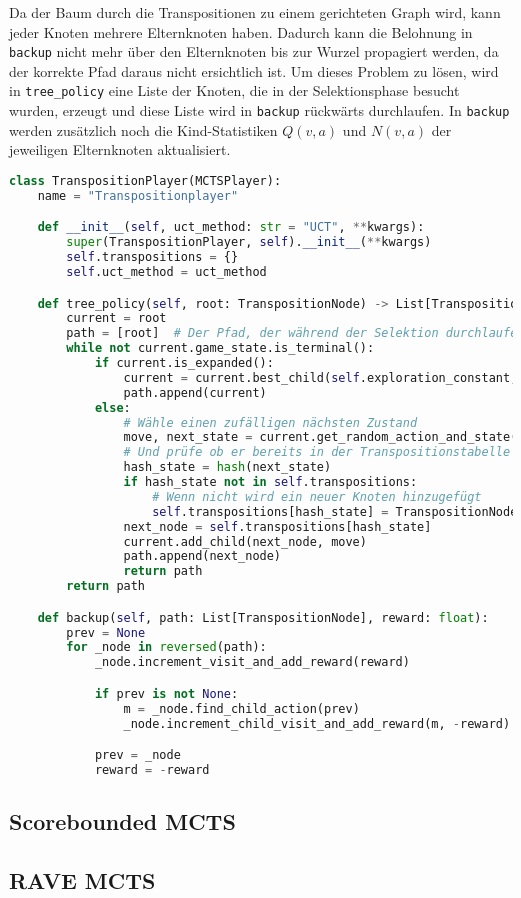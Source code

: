 Da der Baum durch die Transpositionen zu einem gerichteten Graph wird, kann jeder Knoten mehrere Elternknoten haben.
Dadurch kann die Belohnung in \verb|backup| nicht mehr über den Elternknoten bis zur Wurzel propagiert werden, da der korrekte Pfad daraus nicht ersichtlich ist.
Um dieses Problem zu lösen, wird in \verb|tree_policy| eine Liste der Knoten, die in der Selektionsphase besucht wurden, erzeugt und diese Liste wird in \verb|backup| rückwärts durchlaufen.
In \verb|backup| werden zusätzlich noch die Kind-Statistiken $Q(v,a)$ und $N(v,a)$ der jeweiligen Elternknoten aktualisiert.

\begin{lstlisting}[language=Python,label={lst:transposition-player}]
class TranspositionPlayer(MCTSPlayer):
    name = "Transpositionplayer"

    def __init__(self, uct_method: str = "UCT", **kwargs):
        super(TranspositionPlayer, self).__init__(**kwargs)
        self.transpositions = {}
        self.uct_method = uct_method

    def tree_policy(self, root: TranspositionNode) -> List[TranspositionNode]:
        current = root
        path = [root]  # Der Pfad, der während der Selektion durchlaufen wird
        while not current.game_state.is_terminal():
            if current.is_expanded():
                current = current.best_child(self.exploration_constant, uct_method=self.uct_method)
                path.append(current)
            else:
                # Wähle einen zufälligen nächsten Zustand
                move, next_state = current.get_random_action_and_state()
                # Und prüfe ob er bereits in der Transpositionstabelle enthalten ist
                hash_state = hash(next_state)
                if hash_state not in self.transpositions:
                    # Wenn nicht wird ein neuer Knoten hinzugefügt
                    self.transpositions[hash_state] = TranspositionNode(game_state=next_state, parent=current)
                next_node = self.transpositions[hash_state]
                current.add_child(next_node, move)
                path.append(next_node)
                return path
        return path

    def backup(self, path: List[TranspositionNode], reward: float):
        prev = None
        for _node in reversed(path):
            _node.increment_visit_and_add_reward(reward)

            if prev is not None:
                m = _node.find_child_action(prev)
                _node.increment_child_visit_and_add_reward(m, -reward)

            prev = _node
            reward = -reward
\end{lstlisting}

\subsection{Scorebounded MCTS}

\subsection{RAVE MCTS}

